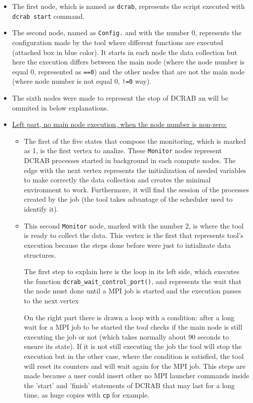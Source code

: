 \documentclass[10pt,a4paper]{report}
\begin{document}
\begin{itemize}
  \item The first node, which is named as \verb+dcrab+, represents the script executed with \verb+dcrab start+ command.
  \item The second node, named as \verb+Config.+ and with the number 0, represents the configuration made by the tool where different functions are executed (attached box in blue color). It starts in each node the data collection but here the execution differs between the main node (where the node number is equal 0, represented as \verb+==0+) and the other nodes that are not the main node (where node number is not equal 0, \verb+!=0+ way).
  \item The sixth nodes were made to represent the stop of DCRAB an will be ommited in below explanations.
  \item \underline{Left part, no main node execution, when the node number is non-zero:}
  \begin{itemize}
    \item The first of the five states that compose the monitoring, which is marked as 1, is the first vertex to analize. These \verb+Monitor+ nodes represent DCRAB processes started in background in each compute nodes. The edge with the next vertex represents the initialization of needed variables to make correctly the data collection and creates the minimal environment to work. Furthermore, it will find the session of the processes created by the job (the tool takes advantage of the scheduler used to identify it).
    \item This second \verb+Monitor+ node, marked with the number 2, is where the tool is ready to collect the data. This vertex is the first that represents tool's execution because the steps done before were just to intializate data structures.

    The first step to explain here is the loop in its left side, which executes the function \texttt{dcrab\_wait\_control\_port()}, and represents the wait that the node must done until a MPI job is started and the execution passes to the next vertex

   On the right part there is drawn a loop with a condition: after a long wait for a MPI job to be started the tool checks if the main node is still executing the job or not (which takes normally about 90 seconds to ensure its state). If it is not still executing the job the tool will stop the execution but in the other case, where the condition is satisfied, the tool will reset its counters and will wait again for the MPI job. This steps are made because a user could insert other no MPI launcher commands inside the 'start' and 'finish' statements of DCRAB that may last for a long time, as huge copies with \verb+cp+ for example.


\end{itemize}
\end{itemize}
\end{document}
